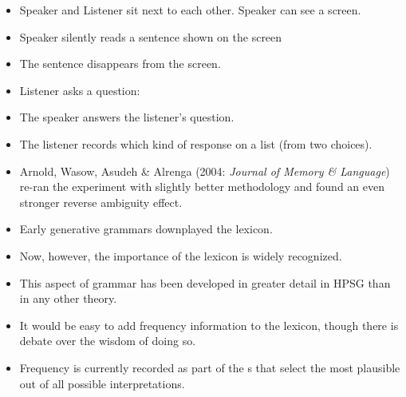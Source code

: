 \documentclass[a4paper,landscape,headrule,footrule]{foils}
\begin{document}

\begin{itemize}
\item Speaker and Listener sit next to each other.  Speaker can see a screen.
\item Speaker silently reads a sentence shown on the screen \\ 
\item The sentence disappears from the screen.
\item Listener asks a question:
\\ 
\item The speaker answers the listener's question.
\\ 
\item The listener records which kind of response on 
a list (from two choices).
\end{itemize}


\begin{center}
  \begin{bchart}[max=100,step=25,unit=\%,scale=2.2]
    \smallskip
  \end{bchart}
\end{center}

\begin{itemize}
\item Arnold, Wasow, Asudeh \& Alrenga (2004:
\textit{Journal of Memory \& Language})
re-ran the experiment with slightly better 
methodology and found an even stronger reverse 
ambiguity effect.
\end{itemize}



\begin{itemize}
\item Early generative grammars downplayed the lexicon.
\item Now, however, the importance of the lexicon is widely 
recognized.
\item This aspect of grammar has been developed in greater 
detail in HPSG than in any other theory.
\item It would be easy to add frequency information to the
lexicon, though there is debate over the wisdom of 
doing so.
\item Frequency is currently recorded as part of the s that select the most plausible out of all
  possible interpretations.
\end{itemize}
\end{document}
